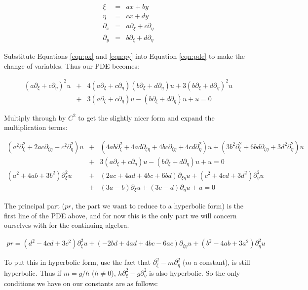 \documentclass[a4paper,12pt]{article}
\begin{document}
\begin{eqnarray}
\xi &=& ax + by\nonumber\\
\eta &=& cx + dy\nonumber\\
\label{eqn:px}
\partial_x &=& a\partial_{\xi} + c\partial_{\eta}\\
\partial_y &=& b\partial_{\xi} + d\partial_{\eta}
\label{eqn:py}
\end{eqnarray}

Substitute Equations \ref{eqn:px} and \ref{eqn:py} into Equation \ref{eqn:pde} to make the change of variables. Thus our PDE becomes:

\begin{eqnarray}
(a\partial_{\xi} + c\partial_{\eta})^2u &+& 4(a\partial_{\xi} + c\partial_{\eta})(b\partial_{\xi} + d\partial_{\eta})u + 3(b\partial_{\xi} + d\partial_{\eta})^2u\nonumber\\ &+& 3(a\partial_{\xi} + c\partial_{\eta})u - (b\partial_{\xi} + d\partial_{\eta})u + u = 0\nonumber
\end{eqnarray}

Multiply through by $C^2$ to get the slightly nicer form and expand the multiplication terms:

\begin{eqnarray}
(a^2\partial_{\xi}^2 + 2ac\partial_{\xi\eta} + c^2\partial_{\eta}^2)u &+& (4ab\partial_{\xi}^2 + 4ad\partial_{\xi\eta} + 4bc\partial_{\xi\eta} + 4cd\partial_{\eta}^2)u + (3b^2\partial_{\xi}^2 + 6bd\partial_{\xi\eta} + 3d^2\partial_{\eta}^2)u\nonumber\\ &+& 3(a\partial_{\xi} + c\partial_{\eta})u - (b\partial_{\xi} + d\partial_{\eta})u + u = 0\nonumber
\nonumber\\
(a^2 + 4ab + 3b^2)\partial_{\xi}^2u &+& (2ac+4ad+4bc+6bd)\partial_{\xi\eta}u + (c^2 + 4cd + 3d^2)\partial_{\eta}^2u\nonumber\\
&+& (3a-b)\partial_{\xi}u + (3c - d)\partial_{\eta}u + u = 0\nonumber
\end{eqnarray}

The principal part ($pr$, the part we want to reduce to a hyperbolic form) is the first line of the PDE above, and for now this is the only part we will concern ourselves with for the continuing algebra.

\begin{eqnarray}
pr = (d^2 - 4cd + 3c^2)\partial_{\xi}^2u + (-2bd+4ad+4bc-6ac)\partial_{\xi\eta}u + (b^2 - 4ab + 3a^2)\partial_{\eta}^2u\nonumber
\end{eqnarray}

To put this in hyperbolic form, use the fact that $\partial_{\xi}^2 - m\partial_{\eta}^2$ ($m$ a constant), is still hyperbolic. Thus if $m = g/h$ ($h\neq0$), $h\partial_{\xi}^2 - g\partial_{\eta}^2$ is also hyperbolic. So the only conditions we have on our constants are as follows: 
\end{document}
